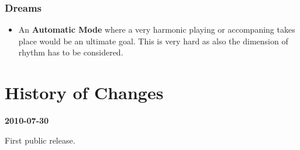 \documentclass[12pt,a4paper,titlepage,oneside]{report}
\begin{document}
\subsection{Dreams}

\begin{itemize}

	\item An \textbf{Automatic Mode} where a very harmonic playing or accompaning takes place would be an ultimate goal. This is very hard as also the dimension of rhythm has to be considered.

\end{itemize}


\appendix
%

\chapter{History of Changes}
\label{chap:history}

\textbf{2010-07-30}

First public release.


\clearpage
{}
{}



\nocite{*}

%
\end{document}
